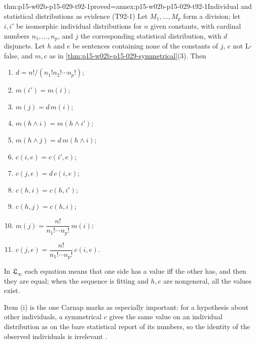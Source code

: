 \begin{hbtheorem}{thm:p15-w02b-p15-029-t92-1}{proved=annex:p15-w02b-p15-029-t92-1}{Individual and statistical distributions as evidence (T92-1)}
Let \(M_1,\ldots,M_p\) form a division; let \(i,i'\) be isomorphic
individual distributions for \(n\) given constants, with cardinal
numbers \(n_1,\ldots,n_p\), and \(j\) the corresponding statistical
distribution, with \(d\) disjuncts. Let \(h\) and \(e\) be sentences
containing none of the constants of \(j\), \(e\) not L-false, and
\(m,c\) as in \cref{thm:p15-w02b-p15-029-symmetrical}(3). Then
\begin{enumerate}
 \item[(a)] \(d=n!/(n_1!n_2!\cdots n_p!)\);
 \item[(b)] \(m(i')=m(i)\);
 \item[(c)] \(m(j)=d\,m(i)\);
 \item[(d)] \(m(h\land i)=m(h\land i')\);
 \item[(e)] \(m(h\land j)=d\,m(h\land i)\);
 \item[(f)] \(c(i,e)=c(i',e)\);
 \item[(g)] \(c(j,e)=d\,c(i,e)\);
 \item[(h)] \(c(h,i)=c(h,i')\);
 \item[(i)] \(c(h,j)=c(h,i)\);
 \item[(j)] \(m(j)=\dfrac{n!}{n_1!\cdots n_p!}\,m(i)\);
 \item[(k)] \(c(j,e)=\dfrac{n!}{n_1!\cdots n_p!}\,c(i,e)\).
\end{enumerate}
In \(\mathfrak L_\infty\) each equation means that one side has a value
iff the other has, and then they are equal; when the sequence is fitting
and \(h,e\) are nongeneral, all the values exist.
\end{hbtheorem}

Item (i) is the one Carnap marks as especially important: for a
hypothesis about other individuals, a symmetrical \(c\) gives the same
value on an individual distribution as on the bare statistical report of
its numbers, so the identity of the observed individuals is irrelevant
\cite[T92-1 and the remark following it, pp.~489--490]{Carnap1950Probability}.

